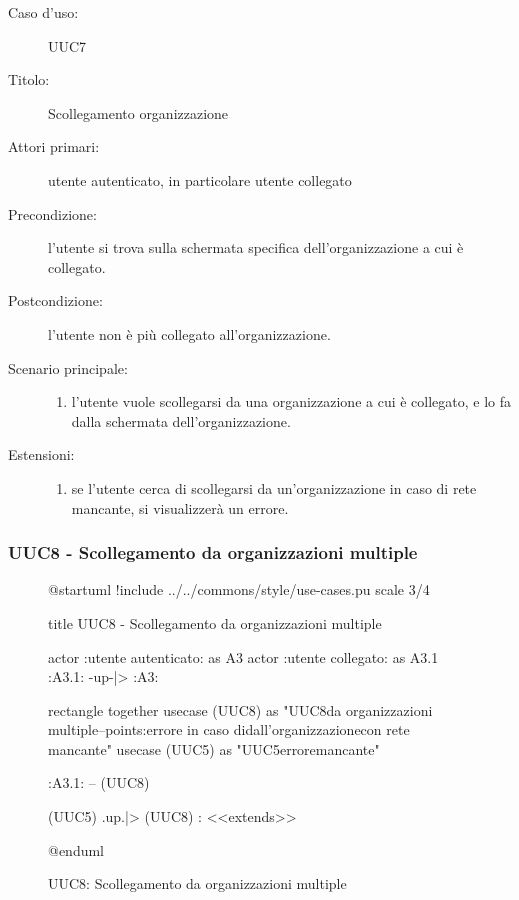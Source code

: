 \documentclass[casi-duso]{subfiles}
\begin{document}
\begin{description}
  \item[Caso d’uso:] UUC7
  \item[Titolo:] Scollegamento organizzazione
  \item[Attori primari:] utente autenticato, in particolare utente collegato
  \item[Precondizione:] l'utente si trova sulla schermata specifica dell'organizzazione a cui è collegato.
  \item[Postcondizione:] l'utente non è più collegato all'organizzazione.
  \item[Scenario principale:]
        \begin{enumerate}
          \item l'utente vuole scollegarsi da una organizzazione a cui è collegato, e lo fa dalla schermata dell'organizzazione.
        \end{enumerate}
  \item[Estensioni:]
        \begin{enumerate}
          \item se l'utente cerca di scollegarsi da un'organizzazione in caso di rete mancante, si visualizzerà un errore.
        \end{enumerate}
\end{description}

\subsubsection{UUC8 - Scollegamento da organizzazioni multiple}%
\label{subsub:UUC8utente}

\begin{figure}[h!] 
  \centering 
  \begin{plantuml}
  @startuml
  !include ../../commons/style/use-cases.pu
  scale 3/4

  title UUC8 - Scollegamento da organizzazioni multiple

  actor :utente autenticato: as A3
  actor :utente collegato: as A3.1
  :A3.1: -up-|> :A3:

  rectangle {
    together {
      usecase (UUC8) as "UUC8\nScollegamento da organizzazioni multiple\n--\nExtension points:\nVisualizzazione errore in caso di\nscollegamento dall'organizzazione\n con rete mancante"
      usecase (UUC5) as "UUC5\nVisualizzazione errore\nrete mancante"
    }
  }

  :A3.1: -- (UUC8)

  (UUC5) .up.|> (UUC8) : <<extends>>

  @enduml
  \end{plantuml} 
  \caption{UUC8: Scollegamento da organizzazioni multiple} 
  \label{fig:uuc8} 
\end{figure}
\end{document}
